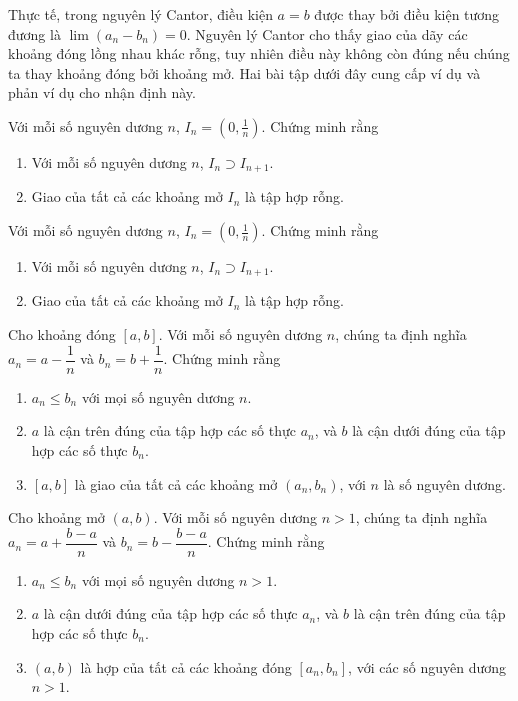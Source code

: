 Thực tế, trong nguyên lý Cantor, điều kiện $a = b$ được thay bởi điều kiện tương đương là $\lim (a_{n} - b_{n}) = 0$. Nguyên lý Cantor cho thấy giao của dãy các khoảng đóng lồng nhau khác rỗng, tuy nhiên điều này không còn đúng nếu chúng ta thay khoảng đóng bởi khoảng mở. Hai bài tập dưới đây cung cấp ví dụ và phản ví dụ cho nhận định này.

\begin{exercise}
	Với mỗi số nguyên dương $n$, $I_{n} = (0, \frac{1}{n})$. Chứng minh rằng
	\begin{enumerate}[label={(\roman*)}]
		\item Với mỗi số nguyên dương $n$, $I_{n}\supset I_{n+1}$.
		\item Giao của tất cả các khoảng mở $I_{n}$ là tập hợp rỗng.
	\end{enumerate}
\end{exercise}

\begin{exercise}
	Với mỗi số nguyên dương $n$, $I_{n} = (0, \frac{1}{n})$. Chứng minh rằng
	\begin{enumerate}[label={(\roman*)}]
		\item Với mỗi số nguyên dương $n$, $I_{n}\supset I_{n+1}$.
		\item Giao của tất cả các khoảng mở $I_{n}$ là tập hợp rỗng.
	\end{enumerate}
\end{exercise}

\begin{exercise}
	Cho khoảng đóng $[a, b]$. Với mỗi số nguyên dương $n$, chúng ta định nghĩa $a_{n} = a - \dfrac{1}{n}$ và $b_{n} = b + \dfrac{1}{n}$. Chứng minh rằng
	\begin{enumerate}[label={(\roman*)}]
		\item $a_{n}\leq b_{n}$ với mọi số nguyên dương $n$.
		\item $a$ là cận trên đúng của tập hợp các số thực $a_{n}$, và $b$ là cận dưới đúng của tập hợp các số thực $b_{n}$.
		\item $[a, b]$ là giao của tất cả các khoảng mở $(a_{n}, b_{n})$, với $n$ là số nguyên dương.
	\end{enumerate}
\end{exercise}

\begin{exercise}
	Cho khoảng mở $(a, b)$. Với mỗi số nguyên dương $n > 1$, chúng ta định nghĩa $a_{n} = a + \dfrac{b-a}{n}$ và $b_{n} = b - \dfrac{b-a}{n}$. Chứng minh rằng
	\begin{enumerate}[label={(\roman*)}]
		\item $a_{n}\leq b_{n}$ với mọi số nguyên dương $n > 1$.
		\item $a$ là cận dưới đúng của tập hợp các số thực $a_{n}$, và $b$ là cận trên đúng của tập hợp các số thực $b_{n}$.
		\item $(a, b)$ là hợp của tất cả các khoảng đóng $[a_{n}, b_{n}]$, với các số nguyên dương $n > 1$.
	\end{enumerate}
\end{exercise}

